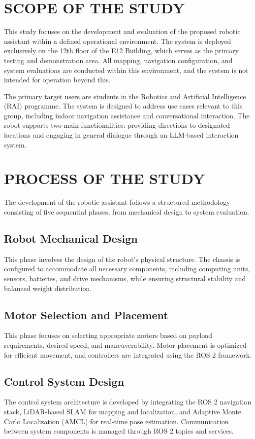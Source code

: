 \section{SCOPE OF THE STUDY}

This study focuses on the development and evaluation of the proposed robotic assistant within a defined operational environment. The system is deployed exclusively on the 12th floor of the E12 Building, which serves as the primary testing and demonstration area. All mapping, navigation configuration, and system evaluations are conducted within this environment, and the system is not intended for operation beyond this.

The primary target users are students in the Robotics and Artificial Intelligence (RAI) programme. The system is designed to address use cases relevant to this group, including indoor navigation assistance and conversational interaction. The robot supports two main functionalities: providing directions to designated locations and engaging in general dialogue through an LLM-based interaction system.

\section{PROCESS OF THE STUDY}

The development of the robotic assistant follows a structured methodology consisting of five sequential phases, from mechanical design to system evaluation.

\subsection{Robot Mechanical Design}
This phase involves the design of the robot’s physical structure. The chassis is configured to accommodate all necessary components, including computing units, sensors, batteries, and drive mechanisms, while ensuring structural stability and balanced weight distribution.

\subsection{Motor Selection and Placement}
This phase focuses on selecting appropriate motors based on payload requirements, desired speed, and maneuverability. Motor placement is optimized for efficient movement, and controllers are integrated using the ROS 2 framework.

\subsection{Control System Design}
The control system architecture is developed by integrating the ROS 2 navigation stack, LiDAR-based SLAM for mapping and localization, and Adaptive Monte Carlo Localization (AMCL) for real-time pose estimation. Communication between system components is managed through ROS 2 topics and services.

